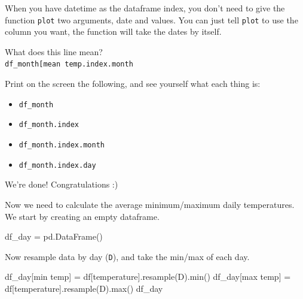 \documentclass[
  letterpaper,
  DIV=11,
  numbers=noendperiod,
  oneside]{scrreprt}
\newenvironment{Shaded}{\begin{snugshade}}{\end{snugshade}}
\newcommand{\BuiltInTok}[1]{\textcolor[rgb]{0.00,0.23,0.31}{#1}}
\newcommand{\NormalTok}[1]{\textcolor[rgb]{0.00,0.23,0.31}{#1}}
\newcommand{\OperatorTok}[1]{\textcolor[rgb]{0.37,0.37,0.37}{#1}}
\newcommand{\StringTok}[1]{\textcolor[rgb]{0.13,0.47,0.30}{#1}}
\providecommand{\tightlist}{%
  \setlength{\itemsep}{0pt}\setlength{\parskip}{0pt}}\usepackage{longtable,booktabs,array}
\begin{document}
When you have datetime as the dataframe index, you don't need to give
the function \texttt{plot} two arguments, date and values. You can just
tell \texttt{plot} to use the column you want, the function will take
the dates by itself.

What does this line mean?\\
\texttt{df\_month{[}\textquotesingle{}mean\ temp\textquotesingle{}{]}.index.month}

Print on the screen the following, and see yourself what each thing is:

\begin{itemize}
\tightlist
\item
  \texttt{df\_month}
\item
  \texttt{df\_month.index}
\item
  \texttt{df\_month.index.month}
\item
  \texttt{df\_month.index.day}
\end{itemize}

We're done! Congratulations :)

Now we need to calculate the average minimum/maximum daily temperatures.
We start by creating an empty dataframe.

\begin{Shaded}
\begin{Highlighting}[]
\NormalTok{df\_day }\OperatorTok{=}\NormalTok{ pd.DataFrame()}
\end{Highlighting}
\end{Shaded}

Now resample data by day (\texttt{D}), and take the min/max of each day.

\begin{Shaded}
\begin{Highlighting}[]
\NormalTok{df\_day[}\StringTok{\textquotesingle{}min temp\textquotesingle{}}\NormalTok{] }\OperatorTok{=}\NormalTok{ df[}\StringTok{\textquotesingle{}temperature\textquotesingle{}}\NormalTok{].resample(}\StringTok{\textquotesingle{}D\textquotesingle{}}\NormalTok{).}\BuiltInTok{min}\NormalTok{()}
\NormalTok{df\_day[}\StringTok{\textquotesingle{}max temp\textquotesingle{}}\NormalTok{] }\OperatorTok{=}\NormalTok{ df[}\StringTok{\textquotesingle{}temperature\textquotesingle{}}\NormalTok{].resample(}\StringTok{\textquotesingle{}D\textquotesingle{}}\NormalTok{).}\BuiltInTok{max}\NormalTok{()}
\NormalTok{df\_day}
\end{Highlighting}
\end{Shaded}
\end{document}

